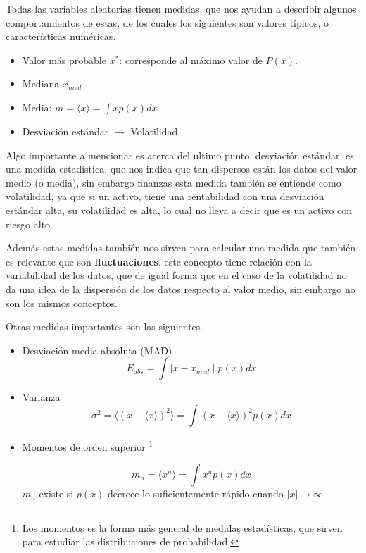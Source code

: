 Todas las variables aleatorias tienen medidas, que nos ayudan a describir algunos comportamientos de estas, de los cuales los siguientes son valores típicos, o características numéricas.

\begin{itemize}
	\item Valor más probable $x^*$: corresponde al máximo valor de $P(x)$.
	\item Mediana $x_{med}$ 
	\item Media: $m = \langle x \rangle = \int x p(x)dx$
	\item Desviación estándar $\rightarrow$ Volatilidad.
\end{itemize}

Algo importante a mencionar es acerca del ultimo punto, desviación estándar, es una medida estadística, que nos indica que tan dispersos están los datos del valor medio (o media), sin embargo finanzas esta medida también se entiende como volatilidad, ya que si un activo, tiene una rentabilidad con una desviación estándar alta, su volatilidad es alta, lo cual no lleva a decir que es un activo con riesgo alto.

Además estas medidas también nos sirven para calcular una medida que también es relevante que son \textbf{fluctuaciones}, este concepto tiene relación con la variabilidad de los datos, que de igual forma que en el caso de la volatilidad no da una idea de la dispersión de los datos respecto al valor medio, sin embargo no son los mismos conceptos.

Otras medidas importantes son las siguientes.

\begin{itemize}
	\item Desviación media absoluta (MAD)
	\begin{equation}
		E_{abs} = \int \mid x - x_{med}\mid p(x) dx
	\end{equation}
	\item Varianza
	\begin{equation}
		\sigma^2 = \langle (x-\langle x\rangle)^2\rangle = \int (x-\langle x\rangle)^2 p(x)dx
	\end{equation}
	\item Momentos de orden superior \footnote{Los momentos es la forma más general de medidas estadísticas, que sirven para estudiar las distribuciones de probabilidad.}
	
	\begin{equation}
		m_n = \langle x^n \rangle = \int x^n p(x) dx
	\end{equation}
	$m_n$ existe si $p(x)$ decrece lo suficientemente rápido cuando $|x|\to \infty$
\end{itemize}


